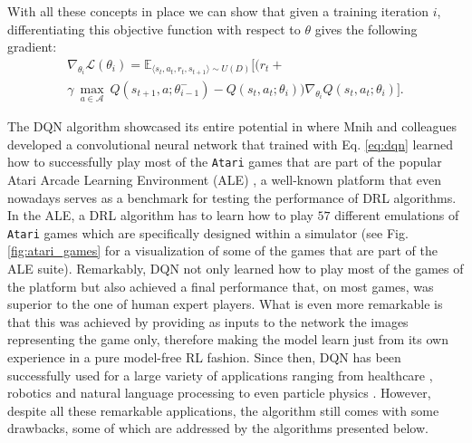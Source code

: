 With all these concepts in place we can show that given a training iteration $i$, differentiating this objective function with respect to $\theta$ gives the following gradient: 
\begin{multline}
\nabla_{\theta_{i}} \mathcal{L}(\theta_{i}) = \mathds{E}_{\langle s_{t},a_{t},r_{t},s_{t+1}\rangle\sim U(D)} \bigg[\big(r_{t} + \\ \gamma \: \underset{a\in \mathcal{A}}{\max}\: Q(s_{t+1}, a; \theta^{-}_{i-1})  - Q(s_{t}, a_{t}; \theta_{i})\big)\nabla_{\theta_{i}} Q(s_{t}, a_{t}; \theta_{i})\bigg].
\label{eq:dqn_gradient}
\end{multline}

The DQN algorithm showcased its entire potential in \cite{mnih2015human} where Mnih and colleagues developed a convolutional neural network that trained with Eq. \ref{eq:dqn} learned how to successfully play most of the \texttt{Atari} games that are part of the popular Atari Arcade Learning Environment (ALE) \cite{bellemare2013arcade}, a well-known platform that even nowadays serves as a benchmark for testing the performance of DRL algorithms. In the ALE, a DRL algorithm has to learn how to play $57$ different emulations of \texttt{Atari} games which are specifically designed within a simulator (see Fig. \ref{fig:atari_games} for a visualization of some of the games that are part of the ALE suite). Remarkably, DQN not only learned how to play most of the games of the platform but also achieved a final performance that, on most games, was superior to the one of human expert players. What is even more remarkable is that this was achieved by providing as inputs to the network the images representing the game only, therefore making the model learn just from its own experience in a pure model-free RL fashion. Since then, DQN has been successfully used for a large variety of applications ranging from healthcare \cite{tseng2017deep,raghu2017continuous}, robotics \cite{kalashnikov2018qt} and natural language processing \cite{he2015deep, narasimhan2015language} to even particle physics \cite{liu2017learning, sajedian2020design}. However, despite all these remarkable applications, the algorithm still comes with some drawbacks, some of which are addressed by the algorithms presented below.


